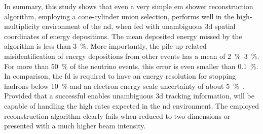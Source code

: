 In summary, this study shows that even a very simple \gls{em} shower reconstruction algorithm, employing a cone-cylinder union selection, performs well in the high-multiplicity environment of the \dune{} \gls{nd}, when fed with unambiguous \gls{3d} spatial coordinates of energy depositions.
The mean deposited energy missed by the algorithm is less than \SI{3}{\percent}.
More importantly, the pile-up-related misidentification of energy depositions from other events has a mean of \SIrange{2}{3}{\percent}.
For more than \SI{50}{\percent} of the neutrino events, this error is even smaller than \SI{0.1}{\percent}.
In comparison, the \gls{fd} is required to have an energy resolution for stopping hadrons below \SI{10}{\percent} and an electron energy scale uncertainty of about \SI{5}{\percent}~\cite{dune4}.
Provided that a successful \larpix{} enables unambiguous \gls{3d} tracking information, \AC{} will be capable of handling the high rates expected in the \dune{} \gls{nd} environment.
The employed reconstruction algorithm clearly fails when reduced to two dimensions or presented with a much higher beam intensity.